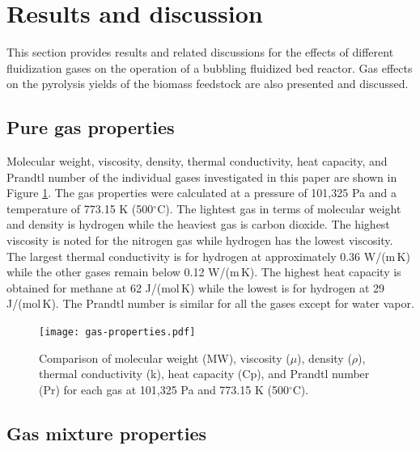 
\section{Results and discussion}

This section provides results and related discussions for the effects of different fluidization gases on the operation of a bubbling fluidized bed reactor. Gas effects on the pyrolysis yields of the biomass feedstock are also presented and discussed.


\subsection{Pure gas properties}

Molecular weight, viscosity, density, thermal conductivity, heat capacity, and Prandtl number of the individual gases investigated in this paper are shown in Figure \ref{fig:gas-properties}. The gas properties were calculated at a pressure of 101,325 Pa and a temperature of 773.15 K (500$^\circ$C). The lightest gas in terms of molecular weight and density is hydrogen while the heaviest gas is carbon dioxide. The highest viscosity is noted for the nitrogen gas while hydrogen has the lowest viscosity. The largest thermal conductivity is for hydrogen at approximately 0.36 W/(m\,K) while the other gases remain below 0.12 W/(m\,K). The highest heat capacity is obtained for methane at 62 J/(mol\,K) while the lowest is for hydrogen at 29 J/(mol\,K). The Prandtl number is similar for all the gases except for water vapor.

\begin{figure}[H]
    \centering
    \texttt{[image: gas-properties.pdf]}
    \caption{Comparison of molecular weight (MW), viscosity ($\mu$), density ($\rho$), thermal conductivity (k), heat capacity (Cp), and Prandtl number (Pr) for each gas at 101,325 Pa and 773.15 K (500$^\circ$C).}
    \label{fig:gas-properties}
\end{figure}


\subsection{Gas mixture properties}


